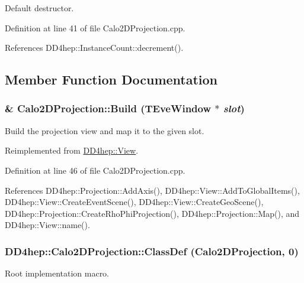 Default destructor. 

Definition at line 41 of file Calo2DProjection.cpp.

References DD4hep::InstanceCount::decrement().

\subsection{Member Function Documentation}
\hypertarget{class_d_d4hep_1_1_calo2_d_projection_a4ac47f2293dd1af3b2dc1b6311edb170}{
\subsubsection[{Build}]{ \& Calo2DProjection::Build (TEveWindow $\ast$ {\em slot})}}
\label{class_d_d4hep_1_1_calo2_d_projection_a4ac47f2293dd1af3b2dc1b6311edb170}


Build the projection view and map it to the given slot. 

Reimplemented from \hyperlink{class_d_d4hep_1_1_view_ab4e12874a9cb6a599f268b027443c6ce}{DD4hep::View}.

Definition at line 46 of file Calo2DProjection.cpp.

References DD4hep::Projection::AddAxis(), DD4hep::View::AddToGlobalItems(), DD4hep::View::CreateEventScene(), DD4hep::View::CreateGeoScene(), DD4hep::Projection::CreateRhoPhiProjection(), DD4hep::Projection::Map(), and DD4hep::View::name().\hypertarget{class_d_d4hep_1_1_calo2_d_projection_a27b84375acec854d3c3fedba3519b7f4}{
\subsubsection[{ClassDef}]{\setlength{\rightskip}{0pt plus 5cm}DD4hep::Calo2DProjection::ClassDef ({\bf Calo2DProjection}, \/  0)}}
\label{class_d_d4hep_1_1_calo2_d_projection_a27b84375acec854d3c3fedba3519b7f4}


Root implementation macro. 

